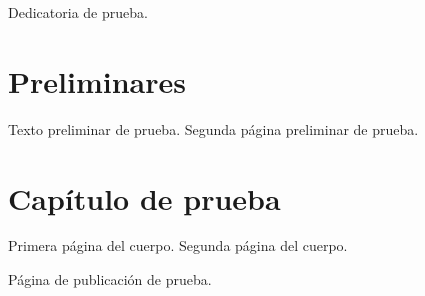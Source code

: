 \documentclass[openright]{book}
\begin{document}
\frontmatter

\clearemptydoublepage
\thispagestyle{empty}
Dedicatoria de prueba.
\chapter*{Preliminares}
Texto preliminar de prueba.
\newpage
Segunda página preliminar de prueba.
\mainmatter
\chapter{Capítulo de prueba}
Primera página del cuerpo.
\newpage
Segunda página del cuerpo.
\newpage
{}
\thispagestyle{headings}
Página de publicación de prueba.
\end{document}
